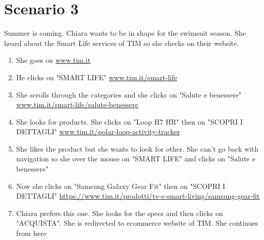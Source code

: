 \section{Scenario 3}
Summer is coming. Chiara wants to be in shape for the swimsuit season. She heard about the Smart Life services of TIM so she checks on their website.

\begin{enumerate}
	\item She goes on \url{www.tim.it}
	\item He clicks on "SMART LIFE" \url{www.tim.it/smart-life}
	\item She scrolls through the categories and she clicks on "Salute e benessere" \url{www.tim.it/smart-life/salute-benessere}
	\item She looks for products. She clicks on "Loop H7 HR" then on "SCOPRI I DETTAGLI" \url{www.tim.it/polar-loop-activity-tracker}
	\item She likes the product but she wants to look for other. She can't go back with navigation so she over the mouse on "SMART LIFE" and clicks on "Salute e benessere"
	\item Now she clicks on "Samsung Galaxy Gear Fit" then on "SCOPRI I DETTAGLI" \url{https://www.tim.it/prodotti/tv-e-smart-living/samsung-gear-fit}
	\item Chiara prefers this one. She looks for the specs and then clicks on "ACQUISTA". She is redirected to ecommerce website of TIM. She continues from here
\end{enumerate}

